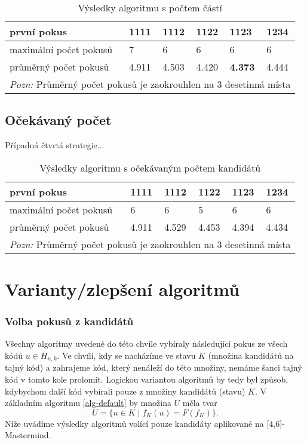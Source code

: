 \begin{table}[h]
\centering
\begin{tabular}{l l l l l l}
\toprule
první pokus & 1111 & 1112 & 1122 & \textbf{1123} & 1234 \\
\midrule

maximální počet pokusů 
& 7 & 6 & 6 & 6 & 6 \\

průměrný počet pokusů 
& 4.911 & 4.503 & 4.420 & \textbf{4.373} & 4.444\\
\bottomrule
\multicolumn{6}{l}{\footnotesize \textit{Pozn:}
Průměrný počet pokusů je zaokrouhlen na $3$ desetinná místa}
\end{tabular}
\caption{Výsledky algoritmu s počtem částí}\label{tabcastivysl}
\end{table}


\subsection{Očekávaný počet}
Případná čtvrtá strategie...
\begin{table}[h]
\centering
\begin{tabular}{l l l l l l}
\toprule
první pokus & 1111 & 1112 & 1122 & 1123 & 1234 \\
\midrule

maximální počet pokusů 
& 6 & 6 & 5 & 6 & 6 \\

průměrný počet pokusů 
& 4.911 & 4.529 & 4.453 & 4.394 & 4.434 \\
\bottomrule
\multicolumn{6}{l}{\footnotesize \textit{Pozn:}
Průměrný počet pokusů je zaokrouhlen na $3$ desetinná místa}
\end{tabular}
\caption{Výsledky algoritmu s očekávaným počtem kandidátů}\label{tabminmaxvysl}
\end{table}

\section{Varianty/zlepšení algoritmů}
\subsubsection{Volba pokusů z kandidátů}
Všechny algoritmy uvedené do této chvíle vybíraly následující pokus ze všech kódů $u\in H_{n,k}$. Ve chvíli, kdy se nacházíme ve stavu $K$ (množina kandidátů na tajný kód) a zahrajeme kód, který nenáleží do této množiny, nemáme šanci tajný kód v tomto kole prolomit. Logickou variantou algoritmů by tedy byl způsob, kdybychom další kód vybírali pouze z množiny kandidátů (stavu) $K$. V základním algoritmu \ref{alg-default} by množina $U$ měla tvar
\[U = \{u \in K \mid f_K(u) = F(f_K)\}.\]
Níže uvádíme výsledky algoritmů volící pouze kandidáty aplikované na [4,6]-Mastermind.


